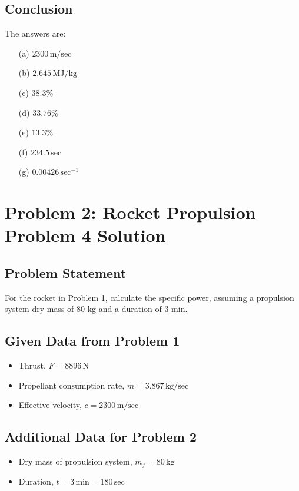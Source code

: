 \documentclass{article}
\begin{document}
\subsection{Conclusion}
The answers are:
\begin{itemize}
    \item[(a)] $2300 \, \text{m/sec}$
    \item[(b)] $2.645 \, \text{MJ/kg}$
    \item[(c)] $38.3\%$
    \item[(d)] $33.76\%$
    \item[(e)] $13.3\%$
    \item[(f)] $234.5 \, \text{sec}$
    \item[(g)] $0.00426 \, \text{sec}^{-1}$
\end{itemize}

\section{Problem 2: Rocket Propulsion Problem 4 Solution}

\subsection{Problem Statement}
For the rocket in Problem 1, calculate the specific power, assuming a propulsion system dry mass of 80 kg and a duration of 3 min.

\subsection{Given Data from Problem 1}
\begin{itemize}
    \item Thrust, \( F = 8896 \, \text{N} \)
    \item Propellant consumption rate, \( \dot{m} = 3.867 \, \text{kg/sec} \)
    \item Effective velocity, \( c = 2300 \, \text{m/sec} \)
\end{itemize}

\subsection{Additional Data for Problem 2}
\begin{itemize}
    \item Dry mass of propulsion system, \( m_f = 80 \, \text{kg} \)
    \item Duration, \( t = 3 \, \text{min} = 180 \, \text{sec} \)
\end{itemize}
\end{document}
